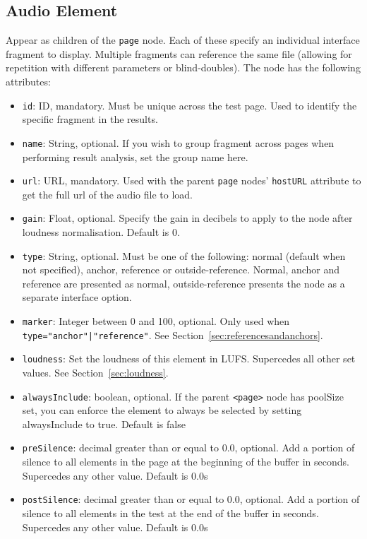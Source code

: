 \documentclass[11pt, oneside]{article}   	%
\begin{document}
    \subsection{Audio Element}
	    \label{sec:audioelement}
	    Appear as children of the \texttt{page} node. Each of these specify an individual interface fragment to display. Multiple fragments can reference the same file (allowing for repetition with different parameters or blind-doubles). The node has the following attributes:
	    \begin{itemize}
	        \item \texttt{id}: ID, mandatory. Must be unique across the test page. Used to identify the specific fragment in the results.
	        \item \texttt{name}: String, optional. If you wish to group fragment across pages when performing result analysis, set the group name here.
	        \item \texttt{url}: URL, mandatory. Used with the parent \texttt{page} nodes' \texttt{hostURL} attribute to get the full url of the audio file to load.
	        \item \texttt{gain}: Float, optional. Specify the gain in decibels to apply to the node after loudness normalisation. Default is 0.
	        \item \texttt{type}: String, optional. Must be one of the following: normal (default when not specified), anchor, reference or outside-reference. Normal, anchor and reference are presented as normal, outside-reference presents the node as a separate interface option.
	        \item \texttt{marker}: Integer between 0 and 100, optional. Only used when \texttt{type="anchor"|"reference"}. See Section~\ref{sec:referencesandanchors}.
	        \item \texttt{loudness}: Set the loudness of this element in LUFS. Supercedes all other set values. See Section~\ref{sec:loudness}.
	        \item \texttt{alwaysInclude}: boolean, optional. If the parent \texttt{<page>} node has poolSize set, you can enforce the element to always be selected by setting alwaysInclude to true. Default is false
             \item \texttt{preSilence}: decimal greater than or equal to 0.0, optional. Add a portion of silence to all elements in the page at the beginning of the buffer in seconds. Supercedes any other value. Default is 0.0s
            \item \texttt{postSilence}: decimal greater than or equal to 0.0, optional. Add a portion of silence to all elements in the test at the end of the buffer in seconds. Supercedes any other value. Default is 0.0s
	    \end{itemize}
\end{document}
